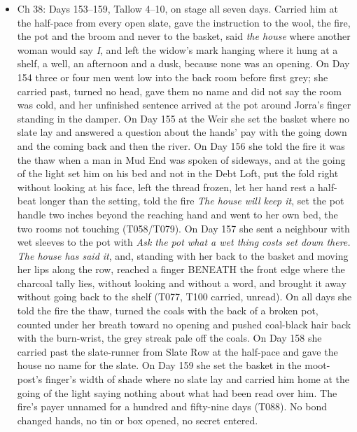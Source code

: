 \documentclass{design/chronicle}
\begin{document}
{\begin{itemize}[leftmargin=1.4em,itemsep=1pt,topsep=3pt,parsep=0pt]
\item Ch 38: Days 153–159, Tallow 4–10, on stage all seven days. Carried him at the half-pace from every open slate, gave the instruction to the wool, the fire, the pot and the broom and never to the basket, said \emph{the house} where another woman would say \emph{I}, and left the widow’s mark hanging where it hung at a shelf, a well, an afternoon and a dusk, because none was an opening. On Day 154 three or four men went low into the back room before first grey; she carried past, turned no head, gave them no name and did not say the room was cold, and her unfinished sentence arrived at the pot around Jorra’s finger standing in the damper. On Day 155 at the Weir she set the basket where no slate lay and answered a question about the hands’ pay with the going down and the coming back and then the river. On Day 156 she told the fire it was the thaw when a man in Mud End was spoken of sideways, and at the going of the light set him on his bed and not in the Debt Loft, put the fold right without looking at his face, left the thread frozen, let her hand rest a half-beat longer than the setting, told the fire \emph{The house will keep it}, set the pot handle two inches beyond the reaching hand and went to her own bed, the two rooms not touching (T058/T079). On Day 157 she sent a neighbour with wet sleeves to the pot with \emph{Ask the pot what a wet thing costs set down there. The house has said it}, and, standing with her back to the basket and moving her lips along the row, reached a finger BENEATH the front edge where the charcoal tally lies, without looking and without a word, and brought it away without going back to the shelf (T077, T100 carried, unread). On all days she told the fire the thaw, turned the coals with the back of a broken pot, counted under her breath toward no opening and pushed coal-black hair back with the burn-wrist, the grey streak pale off the coals. On Day 158 she carried past the slate-runner from Slate Row at the half-pace and gave the house no name for the slate. On Day 159 she set the basket in the moot-post’s finger’s width of shade where no slate lay and carried him home at the going of the light saying nothing about what had been read over him. The fire’s payer unnamed for a hundred and fifty-nine days (T088). No bond changed hands, no tin or box opened, no secret entered.

\end{itemize}

\begin{itemize}[leftmargin=1.4em,itemsep=1pt,topsep=3pt,parsep=0pt]


\end{itemize}}
\end{document}
